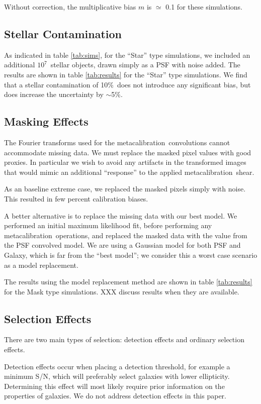 \documentclass[usegraphicx,usenatbib]{mn2e}
\newcommand{\mcal}{metacalibration}
\newcommand{\nsimNstar}{$10^7$}
\newcommand{\nsimNstarperc}{10\%}
\begin{document}
Without correction, the multiplicative bias $m$ is $\simeq$ 0.1
for these simulations.

\subsection{Stellar Contamination} \label{sec:stars}

As indicated in table \ref{tab:sims}, for the ``Star'' type simulations, we
included an additional \nsimNstar\ stellar objects, drawn simply as a PSF with
noise added.  The results are shown in table \ref{tab:results} for the ``Star''
type simulations.  We find that a stellar contamination of 
\nsimNstarperc\ does not introduce any significant bias, but does
increase the uncertainty by $\sim$5\%.

\subsection{Masking Effects} \label{sec:masking}

The Fourier transforms used for the \mcal\ convolutions cannot accommodate
missing data.  We must replace the masked pixel values with good proxies.  In
particular we wish to avoid any artifacts in the transformed images that would
mimic an additional ``response'' to the applied \mcal\ shear.

As an baseline extreme case, we replaced the masked pixels simply with noise.
This resulted in few percent calibration biases.

A better alternative is to replace the missing data with our best model.  We
performed an initial maximum likelihood fit, before performing any \mcal\
operations, and replaced the masked data with the value from the PSF convolved
model.  We are using a Gaussian model for both PSF and Galaxy, which is far
from the ``best model''; we consider this a worst case scenario as a model
replacement. 

The results using the model replacement method are shown in table
\ref{tab:results} for the Mask type simulations.  XXX discuss results when they
are available.


\subsection{Selection Effects} \label{sec:selection}

There are two main types of selection: detection effects and ordinary selection
effects.

Detection effects occur when placing a detection threshold, for example a
minimum S/N, which will preferably select galaxies with lower ellipticity.
Determining this effect will most likely require prior information on the
properties of galaxies. We do not address detection effects in this paper.
\end{document}
